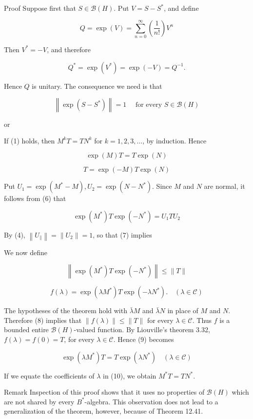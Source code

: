 \documentclass[10pt]{article}
\begin{document}
Proof Suppose first that $S \in \mathscr{B}(H)$. Put $V=S-S^{*}$, and define

$$
Q=\exp (V)=\sum_{n=0}^{\infty}\left(\frac{1}{n !}\right) V^{n}
$$

Then $V^{*}=-V$, and therefore

$$
Q^{*}=\exp \left(V^{*}\right)=\exp (-V)=Q^{-1} .
$$

Hence $Q$ is unitary. The consequence we need is that

$$
\left\|\exp \left(S-S^{*}\right)\right\|=1 \quad \text { for every } S \in \mathscr{B}(H)
$$

or

If (1) holds, then $M^{k} T=T N^{k}$ for $k=1,2,3, \ldots$, by induction. Hence

$$
\exp (M) T=T \exp (N)
$$

$$
T=\exp (-M) T \exp (N)
$$

Put $U_{1}=\exp \left(M^{*}-M\right), U_{2}=\exp \left(N-N^{*}\right)$. Since $M$ and $N$ are normal, it follows from (6) that

$$
\exp \left(M^{*}\right) T \exp \left(-N^{*}\right)=U_{1} T U_{2}
$$

By (4), $\left\|U_{\|}\right\|=\left\|U_{2}\right\|=1$, so that (7) implies

We now define

$$
\left\|\exp \left(M^{*}\right) T \exp \left(-N^{*}\right)\right\| \leq\|T\|
$$

$$
f(\lambda)=\exp \left(\lambda M^{*}\right) T \exp \left(-\lambda N^{*}\right) . \quad(\lambda \in \mathscr{C})
$$

The hypotheses of the theorem hold with $\bar{\lambda} M$ and $\bar{\lambda} N$ in place of $M$ and $N$. Therefore (8) implies that $\|f(\lambda)\| \leq\|T\|$ for every $\lambda \in \mathscr{C}$. Thus $f$ is a bounded entire $\mathscr{B}(H)$-valued function. By Liouville's theorem 3.32, $f(\lambda)=f(0)=T$, for every $\lambda \in \mathscr{C}$. Hence (9) becomes

$$
\exp \left(\lambda M^{*}\right) T=T \exp \left(\lambda N^{*}\right) \quad(\lambda \in \mathscr{C})
$$

If we equate the coefficients of $\lambda$ in (10), we obtain $M^{*} T=T N^{*}$.

Remark Inspection of this proof shows that it uses no properties of $\mathscr{B}(H)$ which are not shared by every $B^{*}$-algebra. This observation does not lead to a generalization of the theorem, however, because of Theorem 12.41.
\end{document}
